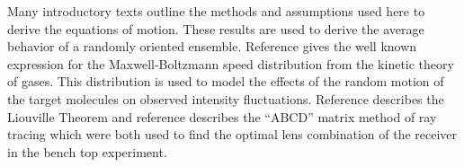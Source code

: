 Many introductory texts \cite{Louisell:1960a,Yariv:1989a,Bransden:1989a,Scully:1997a} outline the methods and assumptions used here to derive the equations of motion. These results are used to derive the average behavior of a randomly oriented ensemble. Reference \cite{Serway:1990a} gives the well known expression for the Maxwell-Boltzmann speed distribution from the kinetic theory of gases. This distribution is used to model the effects of the random motion of the target molecules on observed intensity fluctuations. Reference \cite{Hassani:1999a} describes the Liouville Theorem and reference \cite{Saleh:1991a} describes the ``ABCD'' matrix method of ray tracing which were both used to find the optimal lens combination of the receiver in the bench top experiment.
